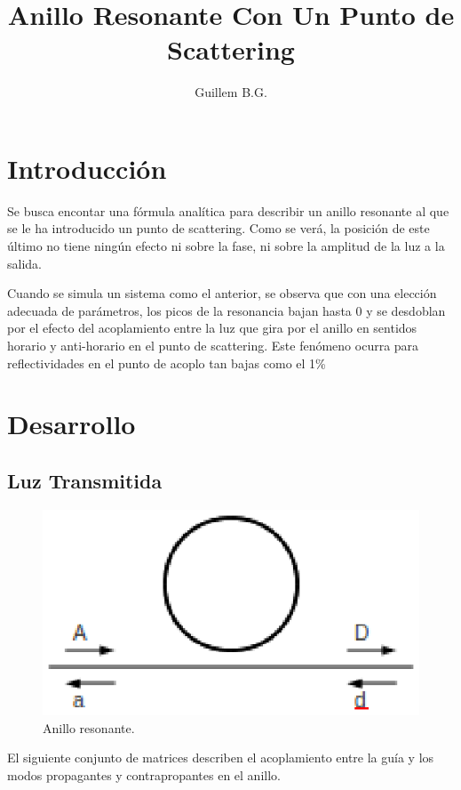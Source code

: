 \documentclass[oneside]{article}
\title{Anillo Resonante Con Un Punto de Scattering}
\author{Guillem B.G.}
\begin{document}
\maketitle
\newpage
\section{Introducción}
Se busca encontar una fórmula analítica para describir un anillo resonante al
que se le ha introducido un punto de scattering. Como se verá, la posición de
este último no tiene ningún efecto ni sobre la fase, ni sobre la amplitud de la
luz a la salida.

Cuando se simula un sistema como el anterior, se observa que con una elección
adecuada de parámetros, los picos de la resonancia bajan hasta 0 y se desdoblan
por el efecto del acoplamiento entre la luz que gira por el anillo en sentidos
horario y anti-horario en el punto de scattering. Este fenómeno ocurra para
reflectividades en el punto de acoplo tan bajas como el 1\%

\section{Desarrollo}
\subsection{Luz Transmitida}
\begin{figure}[!h]
    \centering
    \includegraphics{anillo.eps}
    \caption{Anillo resonante.}
\end{figure}

El siguiente conjunto de matrices describen el acoplamiento entre la guía y los
modos propagantes y contrapropantes en el anillo.
\end{document}
